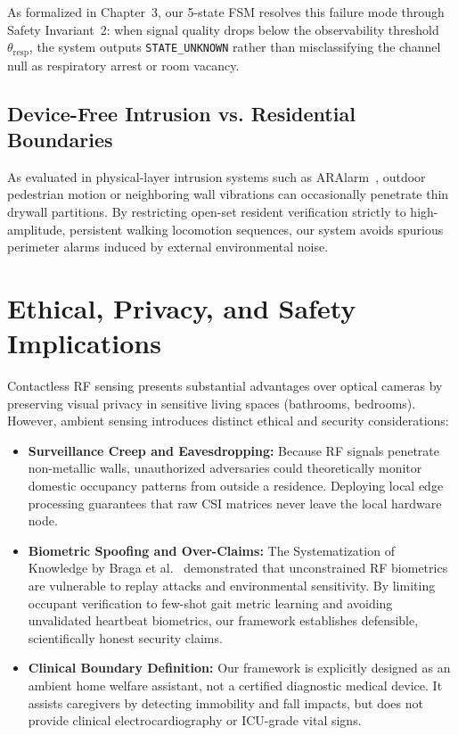 As formalized in Chapter~3, our 5-state FSM resolves this failure mode through Safety Invariant~2: when signal quality drops below the observability threshold $\theta_{\text{resp}}$, the system outputs \texttt{STATE\_UNKNOWN} rather than misclassifying the channel null as respiratory arrest or room vacancy.

\subsection{Device-Free Intrusion vs. Residential Boundaries}
As evaluated in physical-layer intrusion systems such as ARAlarm~\cite{aralarm2024robust}, outdoor pedestrian motion or neighboring wall vibrations can occasionally penetrate thin drywall partitions. By restricting open-set resident verification strictly to high-amplitude, persistent walking locomotion sequences, our system avoids spurious perimeter alarms induced by external environmental noise.

\section{Ethical, Privacy, and Safety Implications}
Contactless RF sensing presents substantial advantages over optical cameras by preserving visual privacy in sensitive living spaces (bathrooms, bedrooms). However, ambient sensing introduces distinct ethical and security considerations:
\begin{itemize}
    \item \textbf{Surveillance Creep and Eavesdropping:} Because RF signals penetrate non-metallic walls, unauthorized adversaries could theoretically monitor domestic occupancy patterns from outside a residence. Deploying local edge processing guarantees that raw CSI matrices never leave the local hardware node.
    \item \textbf{Biometric Spoofing and Over-Claims:} The Systematization of Knowledge by Braga et al.~\cite{sok2024sok} demonstrated that unconstrained RF biometrics are vulnerable to replay attacks and environmental sensitivity. By limiting occupant verification to few-shot gait metric learning and avoiding unvalidated heartbeat biometrics, our framework establishes defensible, scientifically honest security claims.
    \item \textbf{Clinical Boundary Definition:} Our framework is explicitly designed as an ambient home welfare assistant, not a certified diagnostic medical device. It assists caregivers by detecting immobility and fall impacts, but does not provide clinical electrocardiography or ICU-grade vital signs.
\end{itemize}

